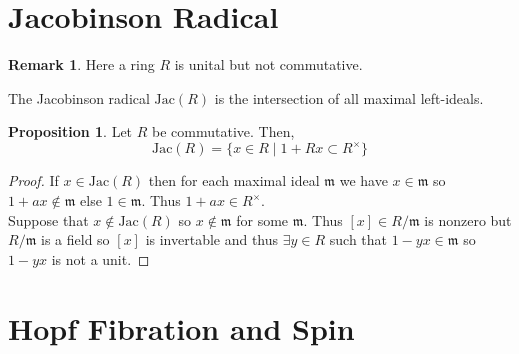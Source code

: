\documentclass[12pt]{extarticle}
\theoremstyle{definition}
\newtheorem{proposition}[theorem]{Proposition}
\newtheorem{remark}{Remark}
\newenvironment{definition}[1][Definition:]{\begin{trivlist}
\item[\hskip \labelsep {\bfseries #1}]}{\end{trivlist}}
\newcommand{\m}{\mathfrak{m}}
\begin{document}
\section{Jacobinson Radical}

\newcommand{\Jac}[1]{\mathrm{Jac}\left( #1 \right)}

\begin{remark}
Here a ring $R$ is unital but not commutative.
\end{remark}


\begin{definition}
The Jacobinson radical $\Jac{R}$ is the intersection of all maximal left-ideals.
\end{definition}

\begin{proposition}
Let $R$ be commutative. Then,
\[ \Jac{R} = \{ x \in R \mid 1 + R x \subset R^\times \} \]
\end{proposition}

\begin{proof}
If $x \in \Jac{R}$ then for each maximal ideal $\m$ we have $x \in \m$ so $1 + a x \notin \m$ else $1 \in \m$. Thus $1 + ax \in R^\times$. 
\bigskip\\
Suppose that $x \notin \Jac{R}$ so $x \notin \m$ for some $\m$. Thus $[x] \in R / \m$ is nonzero but $R / \m$ is a field so $[x]$ is invertable and thus $\exists y \in R$ such that $1 - yx \in \m$ so $1 - yx$ is not a unit. 
\end{proof}

\section{Hopf Fibration and Spin}
\end{document}
